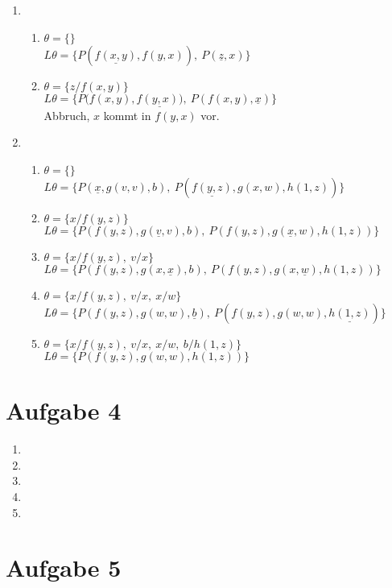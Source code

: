 \documentclass[a4paper,10pt]{article}
\begin{document}
\begin{enumerate}[~~a)]
\begin{enumerate}[~~1.]
    \end{enumerate}

    \item
    \begin{enumerate}[~~1.]
      \item $\theta = \{\}$\\
            $L\theta = \{ P(\underline{f(x, y)}, f(y, x)),~ P(\underline{z}, x) \}$ 
      \item $\theta = \{z/f(x,y)\}$\\
            $L\theta = \{ P(f(x, y), \underline{f(y, x))},~ P(f(x,y), \underline{x}) \}$ \\
            Abbruch, $x$ kommt in $f(y,x)$ vor.

    \end{enumerate}

    \item
    \begin{enumerate}[~~1.]
      \item $\theta = \{\}$\\
            $L\theta = \{ P(\underline{x}, g(v, v), b),~ P(\underline{f(y, z)}, g(x, w), h(1, z)) \}$
      \item $\theta = \{x/f(y,z)\}$\\
            $L\theta = \{ P(f(y,z), g(\underline{v}, v), b),~ P(f(y, z), g(\underline{x}, w), h(1, z)) \}$
      \item $\theta = \{x/f(y,z), ~ v/x\}$\\
            $L\theta = \{ P(f(y,z), g(x, \underline{x}), b),~ P(f(y, z), g(x, \underline{w}), h(1, z)) \}$
      \item $\theta = \{x/f(y,z), ~ v/x, ~ x/w\}$\\
            $L\theta = \{ P(f(y,z), g(w, w), \underline{b}),~ P(f(y, z), g(w, w), \underline{h(1, z)}) \}$
      \item $\theta = \{x/f(y,z), ~ v/x, ~ x/w, ~ b/h(1,z)\}$\\
            $L\theta = \{ P(f(y,z), g(w, w), h(1,z)) \}$
    \end{enumerate}
\end{enumerate}

\section*{Aufgabe 4}

\begin{enumerate}[~~a)]
    \item

    \item

    \item

    \item

    \item
\end{enumerate}

\section*{Aufgabe 5}
\end{document}
